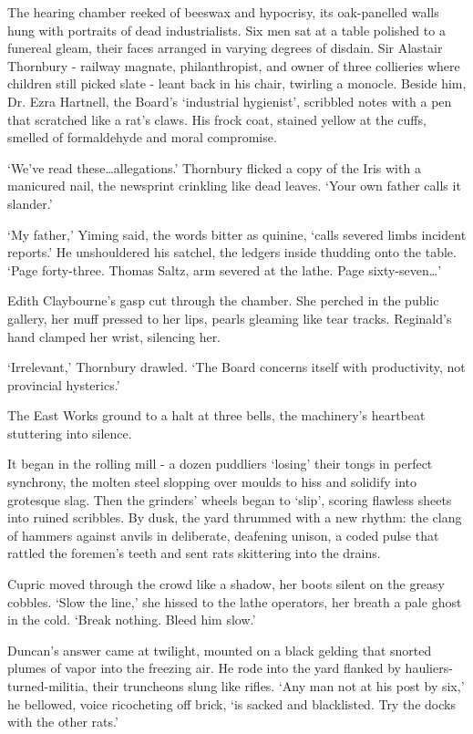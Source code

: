 The hearing chamber reeked of beeswax and hypocrisy, its oak-panelled walls hung with portraits of dead industrialists. Six men sat at a table polished to a funereal gleam, their faces arranged in varying degrees of disdain. Sir Alastair Thornbury - railway magnate, philanthropist, and owner of three collieries where children still picked slate - leant back in his chair, twirling a monocle. Beside him, Dr. Ezra Hartnell, the Board's `industrial hygienist', scribbled notes with a pen that scratched like a rat's claws. His frock coat, stained yellow at the cuffs, smelled of formaldehyde and moral compromise.

`We've read these\dots allegations.' Thornbury flicked a copy of the Iris with a manicured nail, the newsprint crinkling like dead leaves. `Your own father calls it slander.'

`My father,' Yiming said, the words bitter as quinine, `calls severed limbs incident reports.' He unshouldered his satchel, the ledgers inside thudding onto the table. `Page forty-three. Thomas Saltz, arm severed at the lathe. Page sixty-seven\dots'

Edith Claybourne's gasp cut through the chamber. She perched in the public gallery, her muff pressed to her lips, pearls gleaming like tear tracks. Reginald's hand clamped her wrist, silencing her.

`Irrelevant,' Thornbury drawled. `The Board concerns itself with productivity, not provincial hysterics.'

The East Works ground to a halt at three bells, the machinery's heartbeat stuttering into silence.

It began in the rolling mill - a dozen puddliers `losing' their tongs in perfect synchrony, the molten steel slopping over moulds to hiss and solidify into grotesque slag. Then the grinders' wheels began to `slip', scoring flawless sheets into ruined scribbles. By dusk, the yard thrummed with a new rhythm: the clang of hammers against anvils in deliberate, deafening unison, a coded pulse that rattled the foremen's teeth and sent rats skittering into the drains.

Cupric moved through the crowd like a shadow, her boots silent on the greasy cobbles. `Slow the line,' she hissed to the lathe operators, her breath a pale ghost in the cold. `Break nothing. Bleed him slow.'

Duncan's answer came at twilight, mounted on a black gelding that snorted plumes of vapor into the freezing air. He rode into the yard flanked by hauliers-turned-militia, their truncheons slung like rifles. `Any man not at his post by six,' he bellowed, voice ricocheting off brick, `is sacked and blacklisted. Try the docks with the other rats.'

